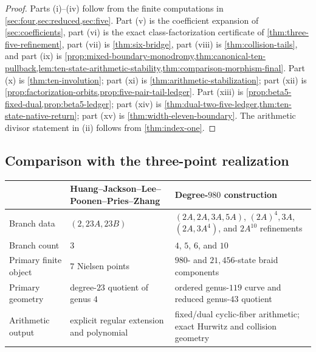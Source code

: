 \documentclass[11pt]{article}
\theoremstyle{remark}
\begin{document}
\begin{proof}
Parts \textnormal{(i)}--\textnormal{(iv)} follow from the finite computations in \cref{sec:four,sec:reduced,sec:five}.  Part \textnormal{(v)} is the coefficient expansion of \cref{sec:coefficients}, part \textnormal{(vi)} is the exact class-factorization certificate of \cref{thm:three-five-refinement}, part \textnormal{(vii)} is \cref{thm:six-bridge}, part \textnormal{(viii)} is \cref{thm:collision-tails}, and part \textnormal{(ix)} is \cref{prop:mixed-boundary-monodromy,thm:canonical-ten-pullback,lem:ten-state-arithmetic-stability,thm:comparison-morphism-final}.  Part \textnormal{(x)} is \cref{thm:ten-involution}; part \textnormal{(xi)} is \cref{thm:arithmetic-stabilization}; part \textnormal{(xii)} is \cref{prop:factorization-orbits,prop:five-pair-tail-ledger}.  Part \textnormal{(xiii)} is \cref{prop:beta5-fixed-dual,prop:beta5-ledger}; part \textnormal{(xiv)} is \cref{thm:dual-two-five-ledger,thm:ten-state-native-return}; part \textnormal{(xv)} is \cref{thm:width-eleven-boundary}.  The arithmetic divisor statement in \textnormal{(ii)} follows from \cref{thm:index-one}.
\end{proof}

\subsection{Comparison with the three-point realization}

\begin{center}
\begin{tabular}{>{\raggedright\arraybackslash}p{}>{\raggedright\arraybackslash}p{}>{\raggedright\arraybackslash}p{}}
\toprule
 & Huang--Jackson--Lee--Poonen--Pries--Zhang & Degree-$980$ construction \\
\midrule
Branch data & $(2,23A,23B)$ & $(2A,2A,3A,5A)$, $(2A)^4,3A$, $(2A,3A^4)$, and $2A^{10}$ refinements \\
Branch count & $3$ & $4$, $5$, $6$, and $10$ \\
Primary finite object & $7$ Nielsen points & $980$- and $21{,}456$-state braid components \\
Primary geometry & degree-$23$ quotient of genus $4$ & ordered genus-$119$ curve and reduced genus-$43$ quotient \\
Arithmetic output & explicit regular extension and polynomial & fixed/dual cyclic-fiber arithmetic; exact Hurwitz and collision geometry \\
\bottomrule
\end{tabular}
\end{center}
\end{document}
